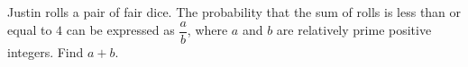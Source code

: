 Justin rolls a pair of fair dice. The probability that the sum of rolls is less than or equal to $4$ can be expressed as $\dfrac{a}{b}$, where $a$ and $b$ are relatively prime positive integers. Find $a+b$.
